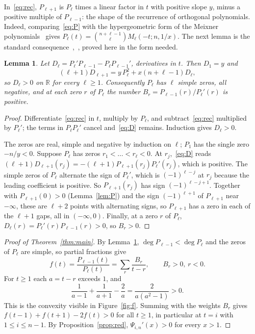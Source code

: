 \documentclass[11pt]{amsart}
\newtheorem{lemma}{Lemma}
\theoremstyle{remark}
\begin{document}
In~\eqref{eq:rec}, $P_{\ell+1}$ is $P_\ell$ times a linear factor in $t$ with positive slope $y$, minus a positive multiple of $P_{\ell-1}$: the shape of the recurrence of orthogonal polynomials. Indeed, comparing~\eqref{eq:P} with the hypergeometric form of the Meixner polynomials~\cite[(9.10.1)]{KLS} gives $P_\ell(t)=\binom{n+\ell-1}{\ell}M_\ell(-t;n,1/x)$. The next lemma is the standard consequence~\cite[\S\S3.3--3.4]{Szego},~\cite{Chihara}, proved here in the form needed.

\begin{lemma}\label{lem:zeros}
Let $D_\ell=P_\ell'P_{\ell-1}-P_\ell P_{\ell-1}'$, derivatives in $t$. Then $D_1=y$ and
\begin{equation}\label{eq:D}
(\ell+1)D_{\ell+1}=y\,P_\ell^2+x(n+\ell-1)D_\ell,
\end{equation}
so $D_\ell>0$ on $\mathbb R$ for every $\ell\ge1$. Consequently $P_\ell$ has $\ell$ simple zeros, all negative, and at each zero $r$ of $P_\ell$ the number $B_r=P_{\ell-1}(r)/P_\ell'(r)$ is positive.
\end{lemma}

\begin{proof}
Differentiate~\eqref{eq:rec} in $t$, multiply by $P_\ell$, and subtract~\eqref{eq:rec} multiplied by $P_\ell'$; the terms in $P_\ell P_\ell'$ cancel and~\eqref{eq:D} remains. Induction gives $D_\ell>0$.

The zeros are real, simple and negative by induction on $\ell$; $P_1$ has the single zero $-n/y<0$. Suppose $P_\ell$ has zeros $r_1<\dots<r_\ell<0$. At $r_j$,~\eqref{eq:D} reads $(\ell+1)D_{\ell+1}(r_j)=-(\ell+1)P_{\ell+1}(r_j)P_\ell'(r_j)$, which is positive. The simple zeros of $P_\ell$ alternate the sign of $P_\ell'$, which is $(-1)^{\ell-j}$ at $r_j$ because the leading coefficient is positive. So $P_{\ell+1}(r_j)$ has sign $(-1)^{\ell-j+1}$. Together with $P_{\ell+1}(0)>0$ (Lemma~\ref{lem:P}) and the sign $(-1)^{\ell+1}$ of $P_{\ell+1}$ near $-\infty$, these are $\ell+2$ points with alternating signs, so $P_{\ell+1}$ has a zero in each of the $\ell+1$ gaps, all in $(-\infty,0)$. Finally, at a zero $r$ of $P_\ell$, $D_\ell(r)=P_\ell'(r)P_{\ell-1}(r)>0$, so $B_r>0$.
\end{proof}

\begin{proof}[Proof of Theorem~\ref{thm:main}]
By Lemma~\ref{lem:zeros}, $\deg P_{\ell-1}<\deg P_\ell$ and the zeros of $P_\ell$ are simple, so partial fractions give
\[
f(t)=\frac{P_{\ell-1}(t)}{P_\ell(t)}=\sum_r\frac{B_r}{t-r},\qquad B_r>0,\ r<0 .
\]
For $t\ge1$ each $a=t-r$ exceeds $1$, and
\[
\frac1{a-1}+\frac1{a+1}-\frac2a=\frac{2}{a(a^2-1)}>0 .
\]
This is the convexity visible in Figure~\ref{fig:f}. Summing with the weights $B_r$ gives $f(t-1)+f(t+1)-2f(t)>0$ for all $t\ge1$, in particular at $t=i$ with $1\le i\le n-1$. By Proposition~\ref{prop:red}, $\Psi_{i,n}'(x)>0$ for every $x>1$.
\end{proof}
\end{document}
